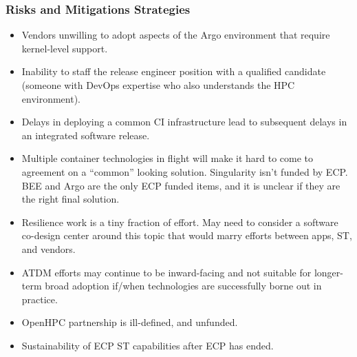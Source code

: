 \subsubsection{Risks and Mitigations Strategies}
\begin{itemize}
	\item Vendors unwilling to adopt aspects of the Argo environment that require kernel-level support.
	\item Inability to staff the release engineer position with a qualified candidate (someone with DevOps expertise who also understands the HPC environment).
	\item Delays in deploying a common CI infrastructure lead to subsequent delays in an integrated software release.
	\item Multiple container technologies in flight will make it hard to come to agreement on a “common” looking solution. Singularity isn't funded by ECP. BEE and Argo are the only ECP funded items, and it is unclear if they are the right final solution.
	\item Resilience work is a tiny fraction of effort. May need to consider a software co-design center around this topic that would marry efforts between apps, ST, and vendors.
	\item ATDM efforts may continue to be inward-facing and not suitable for longer-term broad adoption if/when technologies are successfully borne out in practice.
	\item OpenHPC partnership is ill-defined, and unfunded.
	\item Sustainability of ECP ST capabilities after ECP has ended.
\end{itemize}

